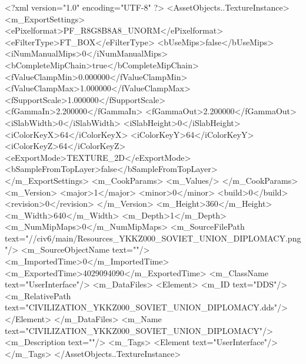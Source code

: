 <?xml version="1.0" encoding="UTF-8" ?>
<AssetObjects..TextureInstance>
	<m_ExportSettings>
		<ePixelformat>PF_R8G8B8A8_UNORM</ePixelformat>
		<eFilterType>FT_BOX</eFilterType>
		<bUseMips>false</bUseMips>
		<iNumManualMips>0</iNumManualMips>
		<bCompleteMipChain>true</bCompleteMipChain>
		<fValueClampMin>0.000000</fValueClampMin>
		<fValueClampMax>1.000000</fValueClampMax>
		<fSupportScale>1.000000</fSupportScale>
		<fGammaIn>2.200000</fGammaIn>
		<fGammaOut>2.200000</fGammaOut>
		<iSlabWidth>0</iSlabWidth>
		<iSlabHeight>0</iSlabHeight>
		<iColorKeyX>64</iColorKeyX>
		<iColorKeyY>64</iColorKeyY>
		<iColorKeyZ>64</iColorKeyZ>
		<eExportMode>TEXTURE_2D</eExportMode>
		<bSampleFromTopLayer>false</bSampleFromTopLayer>
	</m_ExportSettings>
	<m_CookParams>
		<m_Values/>
	</m_CookParams>
	<m_Version>
		<major>1</major>
		<minor>0</minor>
		<build>0</build>
		<revision>0</revision>
	</m_Version>
	<m_Height>360</m_Height>
	<m_Width>640</m_Width>
	<m_Depth>1</m_Depth>
	<m_NumMipMaps>0</m_NumMipMaps>
	<m_SourceFilePath text="//civ6/main/Resources\CIVILIZATION_YKKZ000_SOVIET_UNION_DIPLOMACY.png"/>
	<m_SourceObjectName text=""/>
	<m_ImportedTime>0</m_ImportedTime>
	<m_ExportedTime>4029094090</m_ExportedTime>
	<m_ClassName text="UserInterface"/>
	<m_DataFiles>
		<Element>
			<m_ID text="DDS"/>
			<m_RelativePath text="CIVILIZATION_YKKZ000_SOVIET_UNION_DIPLOMACY.dds"/>
		</Element>
	</m_DataFiles>
	<m_Name text="CIVILIZATION_YKKZ000_SOVIET_UNION_DIPLOMACY"/>
	<m_Description text=""/>
	<m_Tags>
		<Element text="UserInterface"/>
	</m_Tags>
</AssetObjects..TextureInstance>

